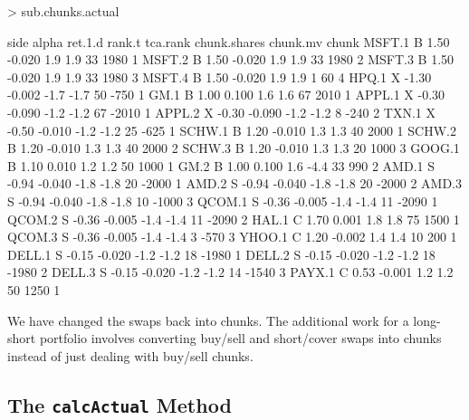 \documentclass{article}
\begin{document}
\begin{Schunk}
\begin{Sinput}
> sub.chunks.actual
\end{Sinput}
\begin{Soutput}
       side alpha ret.1.d rank.t tca.rank chunk.shares chunk.mv chunk
MSFT.1    B  1.50  -0.020    1.9      1.9           33     1980     1
MSFT.2    B  1.50  -0.020    1.9      1.9           33     1980     2
MSFT.3    B  1.50  -0.020    1.9      1.9           33     1980     3
MSFT.4    B  1.50  -0.020    1.9      1.9            1       60     4
HPQ.1     X -1.30  -0.002   -1.7     -1.7           50     -750     1
GM.1      B  1.00   0.100    1.6      1.6           67     2010     1
APPL.1    X -0.30  -0.090   -1.2     -1.2           67    -2010     1
APPL.2    X -0.30  -0.090   -1.2     -1.2            8     -240     2
TXN.1     X -0.50  -0.010   -1.2     -1.2           25     -625     1
SCHW.1    B  1.20  -0.010    1.3      1.3           40     2000     1
SCHW.2    B  1.20  -0.010    1.3      1.3           40     2000     2
SCHW.3    B  1.20  -0.010    1.3      1.3           20     1000     3
GOOG.1    B  1.10   0.010    1.2      1.2           50     1000     1
GM.2      B  1.00   0.100    1.6     -4.4           33      990     2
AMD.1     S -0.94  -0.040   -1.8     -1.8           20    -2000     1
AMD.2     S -0.94  -0.040   -1.8     -1.8           20    -2000     2
AMD.3     S -0.94  -0.040   -1.8     -1.8           10    -1000     3
QCOM.1    S -0.36  -0.005   -1.4     -1.4           11    -2090     1
QCOM.2    S -0.36  -0.005   -1.4     -1.4           11    -2090     2
HAL.1     C  1.70   0.001    1.8      1.8           75     1500     1
QCOM.3    S -0.36  -0.005   -1.4     -1.4            3     -570     3
YHOO.1    C  1.20  -0.002    1.4      1.4           10      200     1
DELL.1    S -0.15  -0.020   -1.2     -1.2           18    -1980     1
DELL.2    S -0.15  -0.020   -1.2     -1.2           18    -1980     2
DELL.3    S -0.15  -0.020   -1.2     -1.2           14    -1540     3
PAYX.1    C  0.53  -0.001    1.2      1.2           50     1250     1
\end{Soutput}
\end{Schunk}

We have changed the swaps back into chunks.  The additional work for a
long-short portfolio involves converting buy/sell and short/cover
swaps into chunks instead of just dealing with buy/sell chunks.

\subsection{The \texttt{calcActual} Method}
\end{document}
